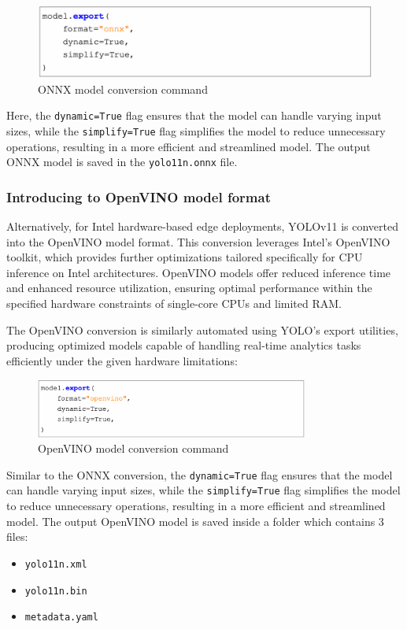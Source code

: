 \begin{figure}[htbp]
    \centering
    \includegraphics[width=1\textwidth]{Figure/onnx_command.png}
    \caption{ONNX model conversion command}
    \label{fig:onnx_command}
\end{figure}

Here, the \texttt{dynamic=True} flag ensures that the model can handle varying input sizes, while the \texttt{simplify=True} flag simplifies the model to reduce unnecessary operations, resulting in a more efficient and streamlined model. The output ONNX model is saved in the \texttt{yolo11n.onnx} file.


\subsubsection{Introducing to OpenVINO model format}

Alternatively, for Intel hardware-based edge deployments, YOLOv11 is converted into the OpenVINO model format. This conversion leverages Intel's OpenVINO toolkit, which provides further optimizations tailored specifically for CPU inference on Intel architectures. OpenVINO models offer reduced inference time and enhanced resource utilization, ensuring optimal performance within the specified hardware constraints of single-core CPUs and limited RAM.

The OpenVINO conversion is similarly automated using YOLO's export utilities, producing optimized models capable of handling real-time analytics tasks efficiently under the given hardware limitations:

\begin{figure}[htbp]
    \centering
    \includegraphics[width=0.8\textwidth]{Figure/openvino_command.png}
    \caption{OpenVINO model conversion command}
    \label{fig:openvino_command}
\end{figure}

Similar to the ONNX conversion, the \texttt{dynamic=True} flag ensures that the model can handle varying input sizes, while the \texttt{simplify=True} flag simplifies the model to reduce unnecessary operations, resulting in a more efficient and streamlined model. The output OpenVINO model is saved inside a folder which contains 3 files:
\begin{itemize}
    \item \texttt{yolo11n.xml}
    \item \texttt{yolo11n.bin}
    \item \texttt{metadata.yaml}
\end{itemize}


